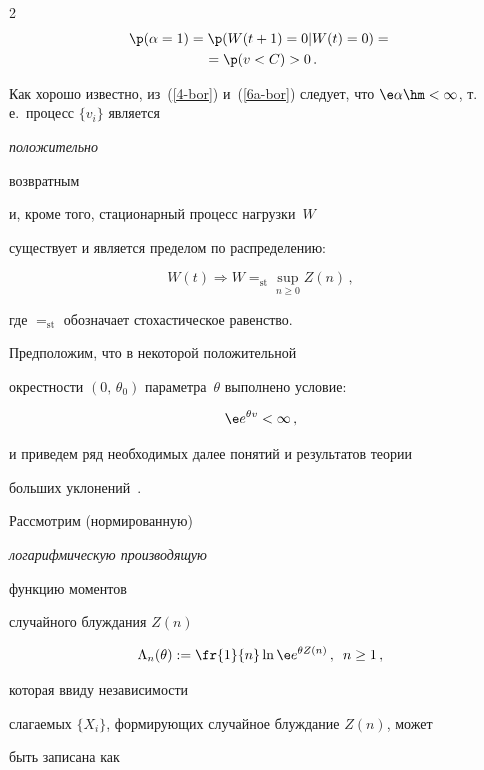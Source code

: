 \begin{multicols}{2}
\begin{multline}

\p(\alpha=1)=\p(W(t+1)=0|W(t)=0)={}\\{}=\p(v<C)>0\,. \label{6a-bor}

\end{multline}

Как хорошо известно, из~(\ref{4-bor}) и~(\ref{6a-bor}) следует, что $\e

\alpha\hm<\infty$, т.\,е.\ процесс $\{v_i\}$ является {\it положительно

возвратным} и, кроме того, стационарный процесс нагрузки~$W$

существует и является пределом  по распределению:

\begin{equation*}

W(t)\Rightarrow W=_{\mathrm{st}}\sup_{n\ge 0} Z(n)\,, %

\end{equation*}

где $=_{\mathrm{st}}$  обозначает стохастическое равенство. %

 Предположим, что в некоторой положительной

 окрестности  $(0,\,\theta_0)$ параметра~$\theta$  выполнено условие:

\begin{equation}

\e e^{\theta v}<\infty\,, \label{7-bor}

\end{equation}

и приведем ряд  необходимых далее   понятий и результатов теории

 больших уклонений~\cite{Ganesh}.

Рассмотрим (нормированную)  {\it логарифмическую производящую

функцию моментов} случайного блуждания $Z(n)$

\begin{equation*}

\Lambda_n(\theta):=\fr{1}{n}\ln\e e^{\theta Z(n)}\,,\enskip n\ge1\,,

\end{equation*}

которая ввиду независимости

 слагаемых $\{X_i\}$, формирующих случайное блуждание $Z(n)$, может

 быть записана как

\begin{equation*}


\end{equation*}
\end{multicols}
